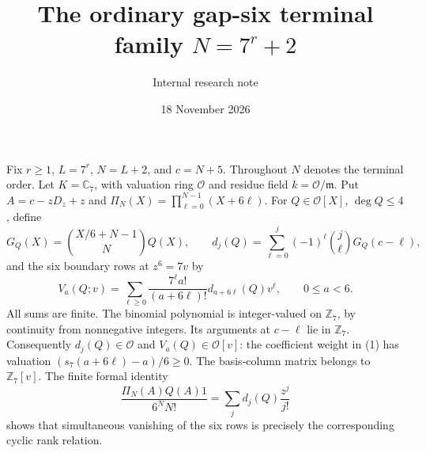 \documentclass[11pt]{article}
\title{The ordinary gap-six terminal family $N=7^r+2$}
\author{Internal research note}
\date{18 November 2026}
\begin{document}
\maketitle
Fix $r\ge1$, $L=7^r$, $N=L+2$, and $c=N+5$.
Throughout $N$ denotes the terminal order.
Let $K=\mathbb C_7$, with valuation ring $\mathcal O$ and residue field
$k=\mathcal O/\mathfrak m$.  Put $A=c-zD_z+z$ and
$\Pi_N(X)=\prod_{\ell=0}^{N-1}(X+6\ell)$.
For $Q\in\mathcal O[X]$, $\deg Q\le4$, define
\[
 G_Q(X)=\binom{X/6+N-1}{N}Q(X),\qquad
 d_j(Q)=\sum_{\ell=0}^j(-1)^\ell\binom j\ell G_Q(c-\ell),
\]
and the six boundary rows at $z^6=7v$ by
\[
 V_a(Q;v)=\sum_{\ell\ge0}\frac{7^\ell a!}{(a+6\ell)!}
                   d_{a+6\ell}(Q)v^\ell,\qquad0\le a<6.       \tag{1}
\]
All sums are finite. The binomial polynomial is integer-valued on
$\mathbb Z_7$, by continuity from nonnegative integers.
Its arguments at $c-\ell$ lie in $\mathbb Z_7$.
Consequently $d_j(Q)\in\mathcal O$ and $V_a(Q)\in\mathcal O[v]$:
the coefficient weight in (1) has valuation
$(s_7(a+6\ell)-a)/6\ge0$.
The basis-column matrix belongs to $\mathbb Z_7[v]$.
The finite formal identity
\[
 \frac{\Pi_N(A)Q(A)1}{6^NN!}=\sum_jd_j(Q)\frac{z^j}{j!}
\]
shows that simultaneous vanishing of the six rows is precisely the
corresponding cyclic rank relation.
\end{document}
